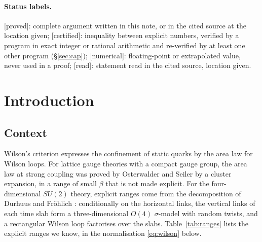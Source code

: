 \documentclass[11pt,a4paper]{article}
\theoremstyle{plain}
\theoremstyle{remark}
\numberwithin{equation}{section}
\newcommand{\st}[1]{\textsf{[#1]}}
\begin{document}
\paragraph{Status labels.}
\st{proved}: complete argument written in this note, or in the cited source at the location given;
\st{certified}: inequality between explicit numbers, verified by a program in exact integer or rational arithmetic and re-verified by
at least one other program (\S\ref{sec:cap});
\st{numerical}: floating-point or extrapolated value, never used in a proof;
\st{read}: statement read in the cited source, location given.

\tableofcontents

\section{Introduction}\label{sec:intro}

\subsection{Context}
Wilson's criterion \cite{Wil74} expresses the confinement of static quarks by the area law for Wilson loops. For lattice gauge
theories with a compact gauge group, the area law at strong coupling was proved by Osterwalder and Seiler \cite[Thm.~5.1]{OS78} by
a cluster expansion, in a range of small $\beta$ that is not made explicit. For the four-dimensional $SU(2)$ theory, explicit ranges
come from the decomposition of Durhuus and Fr\"ohlich \cite{DF80}: conditionally on the horizontal links, the vertical links of each
time slab form a three-dimensional $O(4)$ $\sigma$-model with random twists, and a rectangular Wilson loop factorises over the slabs.
Table~\ref{tab:ranges} lists the explicit ranges we know, in the normalisation \eqref{eq:wilson} below.
\end{document}
